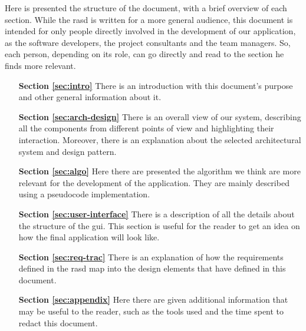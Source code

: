 Here is presented the structure of the document,  with a brief overview of each section.
While the \acs{rasd} is written for a more general audience, this document is intended for only people directly involved in the development of our application, as the software developers, the project consultants and the team managers. 
So, each person, depending on its role, can go directly and read to the section he finds more relevant. 

\begin{itemize}

\item[\textbf{Section \ref{sec:intro}}]There is an introduction with this document's purpose and other general information about it.

\item[\textbf{Section \ref{sec:arch-design}}]There is an overall view of our system, describing all the components from different points of view and  highlighting their interaction. Moreover, there is an explanation about the selected architectural system and design pattern.

\item[\textbf{Section \ref{sec:algo}}]Here there are presented the algorithm we think are more relevant for the development of the application. They are mainly described using a pseudocode implementation.

\item[\textbf{Section \ref{sec:user-interface}}]There is a description of all the details about the structure of the \acl{gui}. This section is useful for the reader  to get an idea on how the final application will look like.

\item[\textbf{Section \ref{sec:req-trac}}]There is an explanation of how the requirements defined in the \acs{rasd} map into the design elements that have defined in this document.

\item[\textbf{Section \ref{sec:appendix}}]Here there are given additional information that may be useful to the reader, such as the tools used and the time spent to redact this document.
\end{itemize}

